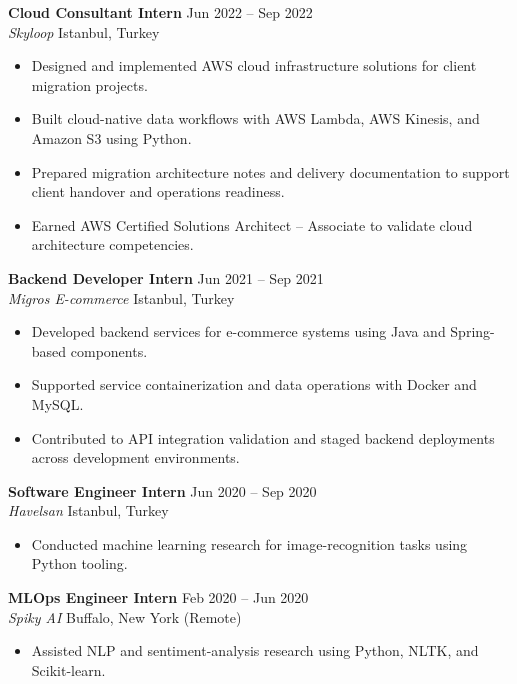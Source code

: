 \documentclass[10pt,letterpaper]{article}
\newcommand{\JobEntry}[4]{
  \textbf{#1} \hfill #2 \\
  \textit{#3} \hfill #4
}
\begin{document}
\JobEntry{Cloud Consultant Intern}{Jun 2022 -- Sep 2022}{Skyloop}{Istanbul, Turkey}
\begin{itemize}
  \item Designed and implemented AWS cloud infrastructure solutions for client migration projects.
  \item Built cloud-native data workflows with AWS Lambda, AWS Kinesis, and Amazon S3 using Python.
  \iflongcv
  \item Prepared migration architecture notes and delivery documentation to support client handover and operations readiness.
  \item Earned AWS Certified Solutions Architect -- Associate to validate cloud architecture competencies.
  \fi
\end{itemize}

\JobEntry{Backend Developer Intern}{Jun 2021 -- Sep 2021}{Migros E-commerce}{Istanbul, Turkey}
\begin{itemize}
  \item Developed backend services for e-commerce systems using Java and Spring-based components.
  \item Supported service containerization and data operations with Docker and MySQL.
  \iflongcv
  \item Contributed to API integration validation and staged backend deployments across development environments.
  \fi
\end{itemize}

\iflongcv
\JobEntry{Software Engineer Intern}{Jun 2020 -- Sep 2020}{Havelsan}{Istanbul, Turkey}
\begin{itemize}
  \item Conducted machine learning research for image-recognition tasks using Python tooling.
\end{itemize}

\JobEntry{MLOps Engineer Intern}{Feb 2020 -- Jun 2020}{Spiky AI}{Buffalo, New York (Remote)}
\begin{itemize}
  \item Assisted NLP and sentiment-analysis research using Python, NLTK, and Scikit-learn.
\end{itemize}
\fi

\iflongcv
\newpage
\fi
\end{document}
